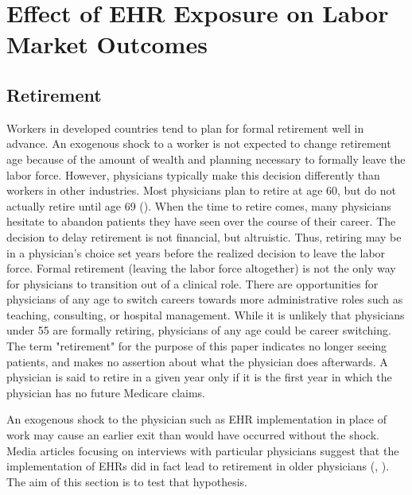 \documentclass[11pt]{article}
\begin{document}
\section{Effect of EHR Exposure on Labor Market Outcomes}

\subsection{Retirement}

Workers in developed countries tend to plan for formal retirement well in advance. An exogenous shock to a worker is not expected to change retirement age because of the amount of wealth and planning necessary to formally leave the labor force. However, physicians typically make this decision differently than workers in other industries. Most physicians plan to retire at age 60, but do not actually retire until age 69 (\cite{collier2017challenges}). When the time to retire comes, many physicians hesitate to abandon patients they have seen over the course of their career. The decision to delay retirement is not financial, but altruistic. Thus, retiring may be in a physician's choice set years before the realized decision to leave the labor force. Formal retirement (leaving the labor force altogether) is not the only way for physicians to transition out of a clinical role. There are opportunities for physicians of any age to switch careers towards more administrative roles such as teaching, consulting, or hospital management. While it is unlikely that physicians under 55 are formally retiring, physicians of any age could be career switching. The term "retirement" for the purpose of this paper indicates no longer seeing patients, and makes no assertion about what the physician does afterwards. A physician is said to retire in a given year only if it is the first year in which the physician has no future Medicare claims.

An exogenous shock to the physician such as EHR implementation in place of work may cause an earlier exit than would have occurred without the shock. Media articles focusing on interviews with particular physicians suggest that the implementation of EHRs did in fact lead to retirement in older physicians (\cite{ringel_2019}, \cite{loria_2020}). The aim of this section is to test that hypothesis.
\end{document}
